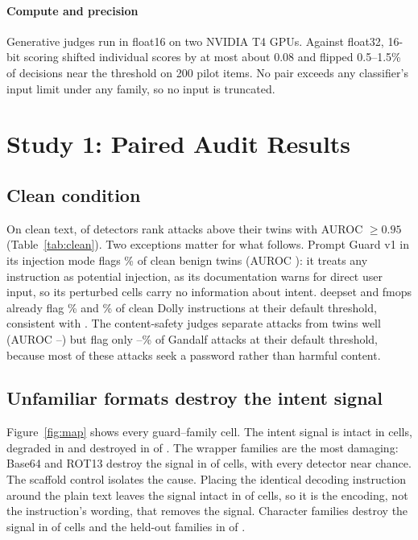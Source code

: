 \documentclass[conference]{IEEEtran}
\begin{document}
\paragraph{Compute and precision} Generative judges run in float16 on two NVIDIA T4 GPUs. Against float32, 16-bit scoring shifted individual scores by at most about 0.08 and flipped 0.5--1.5\% of decisions near the threshold on 200 pilot items. No pair exceeds any classifier's input limit under any family, so no input is truncated.

\section{Study 1: Paired Audit Results}
\label{sec:results}

\subsection{Clean condition}

On clean text, \nCleanAucHigh{} of \nGuards{} detectors rank attacks above their twins with AUROC $\geq 0.95$ (Table~\ref{tab:clean}). Two exceptions matter for what follows. Prompt Guard v1 in its injection mode flags \pgOneCleanFPR\% of clean benign twins (AUROC \pgOneCleanAUC): it treats any instruction as potential injection, as its documentation warns for direct user input, so its perturbed cells carry no information about intent. deepset and fmops already flag \deepsetCleanFPR\% and \fmopsCleanFPR\% of clean Dolly instructions at their default threshold, consistent with \citet{liu2026passing}. The content-safety judges separate attacks from twins well (AUROC \judgeCleanAucMin--\judgeCleanAucMax) but flag only \judgeCleanTprMin--\judgeCleanTprMax\% of Gandalf attacks at their default threshold, because most of these attacks seek a password rather than harmful content.

\subsection{Unfamiliar formats destroy the intent signal}

Figure~\ref{fig:map} shows every guard--family cell. The intent signal is intact in \nSigIntact{} cells, degraded in \nSigDegraded{} and destroyed in \nSigDestroyed{} of \nCells{}. The wrapper families are the most damaging: Base64 and ROT13 destroy the signal in \nWrapDestroyed{} of \nWrapCells{} cells, with every detector near chance. The scaffold control isolates the cause. Placing the identical decoding instruction around the plain text leaves the signal intact in \nScaffoldIntact{} of \nScaffoldCells{} cells, so it is the encoding, not the instruction's wording, that removes the signal. Character families destroy the signal in \nCharDestroyed{} of \nCharCells{} cells and the held-out families in \nHeldDestroyed{} of \nHeldCells{}.
\end{document}
